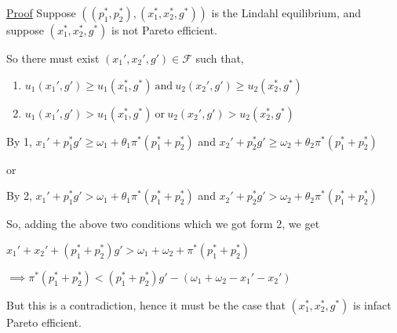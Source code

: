 \documentclass[12pt,a4paper,fleqn]{article}
\begin{document}
\begin{tcolorbox}
 \underline{Proof} Suppose \(\left( (p_{1}^*,p_{2}^*),(x_{1}^*,x_{2}^*,g^*) \right)\)  is the Lindahl equilibrium, and suppose \(\left( x_{1}^*,x_{2}^*,g^* \right)\) is not Pareto efficient.
 
 So there must exist \((x_{1}',x_{2}',g') \in \mathcal{F}\) such that,

 \begin{enumerate}
    \item \(u_{1}(x_{1}',g') \geq u_{1}(x_{1}^*,g^*) \ \text{and} \ u_{2}(x_{2}',g') \geq u_{2}(x_{2}^*,g^*)\)
    \item \(u_{1}(x_{1}',g') > u_{1}(x_{1}^*,g^*) \ \text{or} \ u_{2}(x_{2}',g') > u_{2}(x_{2}^*,g^*)\)
 \end{enumerate}
 
 By 1, \(x_{1}'+p_{1}^*g' \geq \omega_{1} + \theta_{1}\pi^*(p_{1}^*+p_{2}^*)\) and \(x_{2}'+ p_{2}^*g' \geq \omega_{2} + \theta_{2}\pi^*(p_{1}^*+p_{2}^*)\) 

or

 By 2, \(x_{1}'+p_{1}^*g' > \omega_{1} + \theta_{1}\pi^*(p_{1}^*+p_{2}^*)\) and \(x_{2}' +p_{2}^*g' > \omega_{2} + \theta_{2}\pi^*(p_{1}^*+p_{2}^*)\) 

 So, adding the above two conditions which we got form 2, we get

 \(x_{1}' + x_{2}' + (p_{1}^* + p_{2}^*) g' > \omega_{1} + \omega_{2} + \pi^*(p_{1}^* + p_{2}^*)\)  

 \(\implies \pi^* (p_{1}^* + p_{2}^*) < (p_{1}^* + p_{2}^*)g' - (\omega_{1} +\omega_{2} - x_{1}' -x_{2}')\)  

 But this is a contradiction, hence it must be the case that \((x_{1}^*, x_{2}^*,g^*)\) is infact Pareto efficient.  
\end{tcolorbox}
\end{document}
